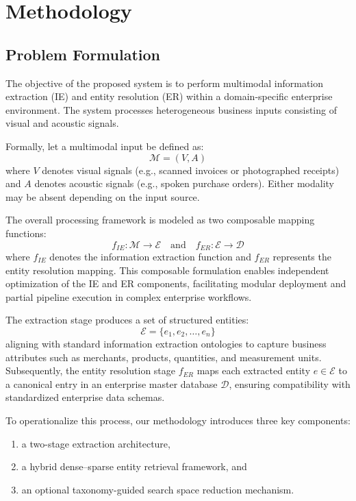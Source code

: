 \section{Methodology}

\subsection{Problem Formulation}
The objective of the proposed system is to perform multimodal information extraction (IE) and entity resolution (ER) within a domain-specific enterprise environment. The system processes heterogeneous business inputs consisting of visual and acoustic signals.

Formally, let a multimodal input be defined as:
\begin{equation}
\mathcal{M} = (V, A)
\end{equation}
where $V$ denotes visual signals (e.g., scanned invoices or photographed receipts) and $A$ denotes acoustic signals (e.g., spoken purchase orders). Either modality may be absent depending on the input source.

The overall processing framework is modeled as two composable mapping functions:
\begin{equation}
f_{IE}: \mathcal{M} \to \mathcal{E} \quad \text{and} \quad f_{ER}: \mathcal{E} \to \mathcal{D}
\end{equation}
where $f_{IE}$ denotes the information extraction function and $f_{ER}$ represents the entity resolution mapping. This composable formulation enables independent optimization of the IE and ER components, facilitating modular deployment and partial pipeline execution in complex enterprise workflows.

The extraction stage produces a set of structured entities:
\begin{equation}
\mathcal{E} = \{e_1, e_2, \ldots, e_n\}
\end{equation}
aligning with standard information extraction ontologies to capture business attributes such as merchants, products, quantities, and measurement units. Subsequently, the entity resolution stage $f_{ER}$ maps each extracted entity $e \in \mathcal{E}$ to a canonical entry in an enterprise master database $\mathcal{D}$, ensuring compatibility with standardized enterprise data schemas.

To operationalize this process, our methodology introduces three key components:
\begin{enumerate}
    \item a two-stage extraction architecture,
    \item a hybrid dense–sparse entity retrieval framework, and
    \item an optional taxonomy-guided search space reduction mechanism.
\end{enumerate}

